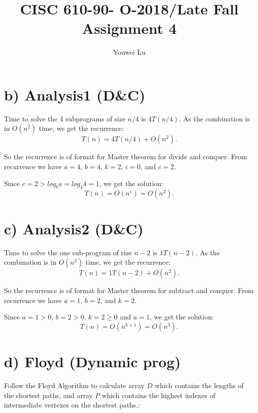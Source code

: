 \documentclass[natbib,12pt]{article}
\title{CISC 610-90- O-2018/Late Fall \linebreak Assignment 4}
\author{Youwei Lu}
\date{}
\begin{document}
	\maketitle
	
	\section*{b) Analysis1 (D\&C)}
	
	Time to solve the 4 subprograms of size $n/4$ is $4T(n/4)$. As the combination is in $O(n^2)$ time, we get the recurrence:
	\begin{equation*}
	T(n) = 4 T(n/4) + O(n^2).
	\end{equation*}
	
	So the recurrence is of format for Master theorem for divide and conquer.
	From recurrence we have $a=4$, $b=4$, $k=2$, $i=0$, and $c=2$.
	
	Since $c= 2 > log_b a = log_ 4 4 = 1$, we get the solution:
	\begin{equation*}
	T(n) = O(n^c) = O(n^2).
	\end{equation*}
	
	\section*{c) Analysis2 (D\&C)}
	Time to solve the one sub-program of size $n-2$ is $1T(n-2)$. As the combination is in $O(n^2)$ time, we get the recurrence:
	\begin{equation*}
	T(n) = 1 T(n-2) + O(n^2).
	\end{equation*}
	
	So the recurrence is of format for Master theorem for subtract and conquer. From recurrence we have $a=1$, $b=2$, and $k = 2$. 
	
	Since $a=1>0$, $b=2>0$, $k=2\ge0$ and  $a=1$, we get the solution:
	\begin{equation*}
	T(n) = O(n^{k+1}) = O(n^3).
	\end{equation*}
	
	\newpage
	\section*{d) Floyd (Dynamic prog)}
	Follow the Floyd Algorithm to calculate array $D$ which contains the lengths of the shortest paths, and array $P$ which contains the highest indexes of intermediate vertexes on the shortest paths.:
	
\end{document}
